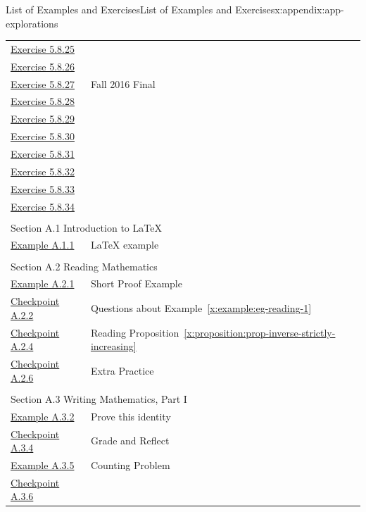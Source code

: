 \documentclass[oneside,10pt,]{book}
\newcommand{\xreffont}{\relax}
\numberwithin{equation}{section}
\begin{document}
\begin{appendixptx}{List of Examples and Exercises}{}{List of Examples and Exercises}{}{}{x:appendix:app-explorations}
\begin{longtable}[l]{ll}
\hyperlink{g:exercise:id549551}{Exercise 5.8.25}& \\
\hyperlink{g:exercise:id549547}{Exercise 5.8.26}& \\
\hyperlink{x:exercise:ex-deg-connected}{Exercise 5.8.27}& Fall 2016 Final\\
\hyperlink{g:exercise:id549599}{Exercise 5.8.28}& \\
\hyperlink{g:exercise:id549622}{Exercise 5.8.29}& \\
\hyperlink{g:exercise:id549638}{Exercise 5.8.30}& \\
\hyperlink{g:exercise:id549644}{Exercise 5.8.31}& \\
\hyperlink{g:exercise:id549648}{Exercise 5.8.32}& \\
\hyperlink{g:exercise:id549658}{Exercise 5.8.33}& \\
\hyperlink{g:exercise:id549680}{Exercise 5.8.34}& \\
\multicolumn{2}{l}{\null}\\[1.5ex] \multicolumn{2}{l}{\large Section A.1 Introduction to \LaTeX{}}\\[0.5ex]
\hyperref[x:example:eg-latex]{Example A.1.1}& \LaTeX{} example\\
\multicolumn{2}{l}{\null}\\[1.5ex] \multicolumn{2}{l}{\large Section A.2 Reading Mathematics}\\[0.5ex]
\hyperref[x:example:eg-reading-1]{Example A.2.1}& Short Proof Example\\
\hyperref[x:exercise:ex-reading-1]{Checkpoint A.2.2}& Questions about Example~{\xreffont\ref*{x:example:eg-reading-1}}\\
\hyperref[x:exercise:ex-reading-2]{Checkpoint A.2.4}& Reading Proposition~{\xreffont\ref*{x:proposition:prop-inverse-strictly-increasing}}\\
\hyperref[x:exercise:ex-reading-3]{Checkpoint A.2.6}& Extra Practice\\
\multicolumn{2}{l}{\null}\\[1.5ex] \multicolumn{2}{l}{\large Section A.3 Writing Mathematics, Part I}\\[0.5ex]
\hyperref[x:example:eg-evaluate-1]{Example A.3.2}& Prove this identity\\
\hyperref[x:exercise:ex-writing-induction-guide]{Checkpoint A.3.4}& Grade and Reflect\\
\hyperref[x:example:eg-evaluate-2]{Example A.3.5}& Counting Problem\\
\hyperref[x:exercise:ex-evaluate-2-a]{Checkpoint A.3.6}& \\

\end{longtable}
\end{appendixptx}
\end{document}
